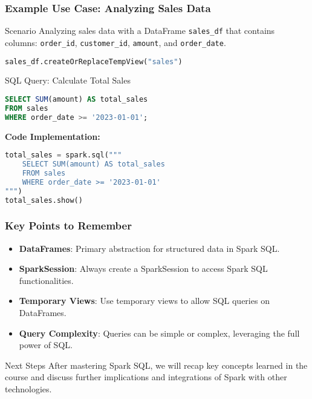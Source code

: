 \documentclass[aspectratio=169]{beamer}
\begin{document}
\begin{frame}[fragile]
    \frametitle{Example Use Case: Analyzing Sales Data}
    \begin{block}{Scenario}
        Analyzing sales data with a DataFrame \texttt{sales\_df} that contains columns: \texttt{order\_id}, \texttt{customer\_id}, \texttt{amount}, and \texttt{order\_date}.
        \begin{lstlisting}[language=Python]
sales_df.createOrReplaceTempView("sales")
        \end{lstlisting}
    \end{block}

    \begin{block}{SQL Query: Calculate Total Sales}
        \begin{lstlisting}[language=SQL]
SELECT SUM(amount) AS total_sales 
FROM sales 
WHERE order_date >= '2023-01-01';
        \end{lstlisting}

        \textbf{Code Implementation:}
        \begin{lstlisting}[language=Python]
total_sales = spark.sql("""
    SELECT SUM(amount) AS total_sales 
    FROM sales 
    WHERE order_date >= '2023-01-01'
""")
total_sales.show()
        \end{lstlisting}
    \end{block}
\end{frame}

\begin{frame}[fragile]
    \frametitle{Key Points to Remember}
    \begin{itemize}
        \item \textbf{DataFrames}: Primary abstraction for structured data in Spark SQL.
        \item \textbf{SparkSession}: Always create a SparkSession to access Spark SQL functionalities.
        \item \textbf{Temporary Views}: Use temporary views to allow SQL queries on DataFrames.
        \item \textbf{Query Complexity}: Queries can be simple or complex, leveraging the full power of SQL.
    \end{itemize}

    \begin{block}{Next Steps}
        After mastering Spark SQL, we will recap key concepts learned in the course and discuss further implications and integrations of Spark with other technologies.
    \end{block}
\end{frame}
\end{document}
